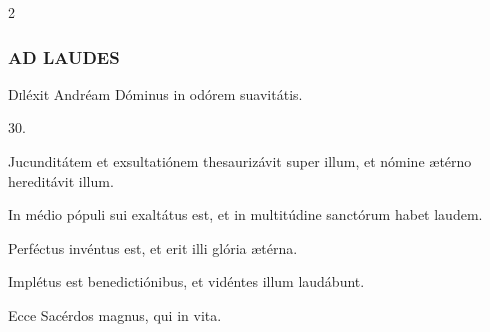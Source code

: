 \documentclass[9pt,twoside]{extarticle}
\begin{document}
\begin{multicols}{2}
\subsubsection*{\center \textsc{AD LAUDES}}
\begin{center} \end{center}

\lettrine{D}iléxit Andréam Dóminus in odórem suavitátis.

\begin{tightlist}{}
\item {} 30.
\item {} Jucunditátem et exsultatiónem thesaurizávit super illum, et nómine ætérno hereditávit illum.
\item {} In médio pópuli sui exaltátus est, et in multitúdine sanctórum habet laudem.
\item {} Perféctus invéntus est, et erit illi glória ætérna.
\item {} Implétus est benedictiónibus, et vidéntes illum laudábunt.
\item {} Ecce Sacérdos magnus, qui in vita.
\end{tightlist}


\end{multicols}
\end{document}
